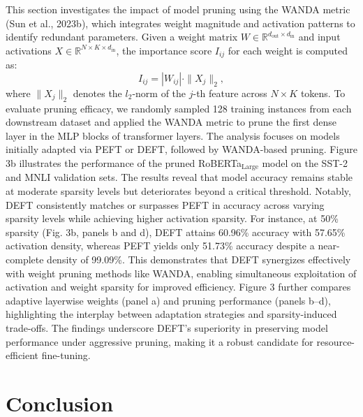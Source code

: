 \documentclass[11pt,a4paper]{article}
\begin{document}
This section investigates the impact of model pruning using the WANDA metric (Sun et al., 2023b), which integrates weight magnitude and activation patterns to identify redundant parameters. Given a weight matrix \(W \in \mathbb{R}^{d_{\text{out}} \times d_{\text{in}}}\) and input activations \(X \in \mathbb{R}^{N \times K \times d_{\text{in}}}\), the importance score \(I_{ij}\) for each weight is computed as: \[I_{ij} = |W_{ij}| \cdot \|X_j\|_2,\] where \(\|X_j\|_2\) denotes the \(l_2\)-norm of the \(j\)-th feature across \(N \times K\) tokens. To evaluate pruning efficacy, we randomly sampled 128 training instances from each downstream dataset and applied the WANDA metric to prune the first dense layer in the MLP blocks of transformer layers. The analysis focuses on models initially adapted via PEFT or DEFT, followed by WANDA-based pruning. Figure 3b illustrates the performance of the pruned RoBERTa\(_{\text{Large}}\) model on the SST-2 and MNLI validation sets. The results reveal that model accuracy remains stable at moderate sparsity levels but deteriorates beyond a critical threshold. Notably, DEFT consistently matches or surpasses PEFT in accuracy across varying sparsity levels while achieving higher activation sparsity. For instance, at 50\% sparsity (Fig. 3b, panels b and d), DEFT attains 60.96\% accuracy with 57.65\% activation density, whereas PEFT yields only 51.73\% accuracy despite a near-complete density of 99.09\%. This demonstrates that DEFT synergizes effectively with weight pruning methods like WANDA, enabling simultaneous exploitation of activation and weight sparsity for improved efficiency. Figure 3 further compares adaptive layerwise weights (panel a) and pruning performance (panels b–d), highlighting the interplay between adaptation strategies and sparsity-induced trade-offs. The findings underscore DEFT’s superiority in preserving model performance under aggressive pruning, making it a robust candidate for resource-efficient fine-tuning.




\section{Conclusion}
\end{document}
